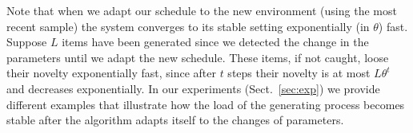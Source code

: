 
Note that when we adapt our schedule to the new environment (using the most
recent sample) the system converges to its stable setting exponentially (in
$\theta$) fast. Suppose $L$ items have been generated since we detected the
change in the parameters until we adapt the new schedule. These items, if not
caught, loose their novelty exponentially fast, since after $t$ steps their
novelty is at most $L\theta^t$ and decreases exponentially. In our experiments
(Sect.~\ref{sec:exp}) we provide different examples that illustrate how the load
of the generating process becomes stable after the algorithm adapts itself to
the changes of parameters.

%
%
%
%
%
%
%


